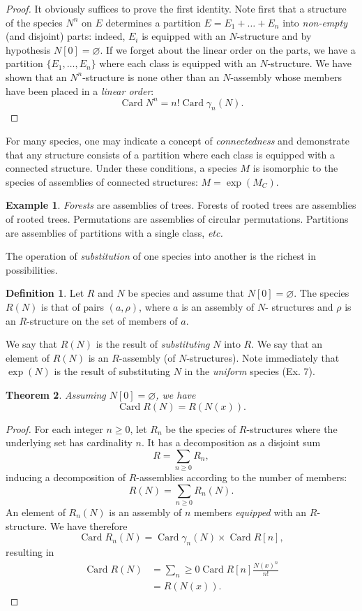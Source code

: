 \documentclass{amsart}
\newtheorem{thm}{Theorem}[section]
\theoremstyle{definition}
\newtheorem{defn}[thm]{Definition}
\newtheorem{ex}{Example}
\theoremstyle{remark}
\DeclareMathOperator{\Card}{Card}
\newcommand{\term}[1]{\emph{#1}}
\newcommand{\etc}{\textit{etc.}\xspace}
\begin{document}
\begin{proof}
It obviously suffices to prove the first identity.  Note first
that a structure of the species $N^n$ on $E$ determines a partition $E
= E_1 + \dots + E_n$ into \emph{non-empty} (and disjoint) parts:
indeed, $E_i$ is equipped with an $N$-structure and by hypothesis $N
[0] = \varnothing$. If we forget about the linear order on the parts,
we have a partition $\{E_1, \dots, E_n\}$ where each class is equipped
with an $N$-structure. We have shown that an $N^n$-structure is none
other than an $N$-assembly whose members have been placed in a
\emph{linear order}:
\[ \Card N^n = n! \Card \gamma_n(N). \]
\end{proof}

For many species, one may indicate a concept of \term{connectedness}
and demonstrate that any structure consists of a partition
where each class is equipped with a connected structure. Under these conditions, a
species $M$ is isomorphic to the species of assemblies of connected structures:
$M = \exp (M_C)$.

\begin{ex}
  \term{Forests} are assemblies of trees. Forests of rooted trees are
  assemblies of rooted trees. Permutations are assemblies of circular
  permutations. Partitions are assemblies of partitions with a single
  class, \etc
\end{ex}

The operation of \term{substitution} of one species into another is
the richest in possibilities.

\begin{defn}
Let $R$ and $N$ be species and assume that $N [0] = \varnothing$.
The species $R (N)$ is that of pairs $(a, \rho)$, where $a$ is an assembly of $N$-
structures and $\rho$ is an $R$-structure on the set of members of $a$.

We say that $R (N)$ is the result of \term{substituting} $N$ into $R$. We
say that an element of $R (N)$ is an $R$-assembly (of $N$-structures). Note
immediately that $\exp (N)$ is the result of substituting $N$ in
the \emph{uniform} species (Ex. 7).
\end{defn}

\begin{thm} \label{thm:card-subst}
  Assuming $N [0] = \varnothing$, we have
  \[ \Card R (N) = R (N (x)). \]
\end{thm}

\begin{proof}
For each integer $n \geq 0$, let $R_n$ be the species of $R$-structures
where the underlying set has cardinality $n$. It has a decomposition
as a disjoint sum
\[ R = \sum_{n \geq 0} R_n, \]
inducing a decomposition of $R$-assemblies according to the number of
members:
\[ R (N) = \sum_{n \geq 0} R_n(N). \]
An element of $R_n(N)$ is an assembly of $n$ members \emph{equipped} with an $R$-structure.
We have therefore
\[ \Card R_n(N) = \Card \gamma_n(N) \times \Card R [n], \]
resulting in
\begin{align*} \Card R(N) &= \sum_n \geq 0 \Card R[n]
  \frac{N(x)^n}{n!} \\
  &= R(N(x)).
\end{align*}
\end{proof}
\end{document}
